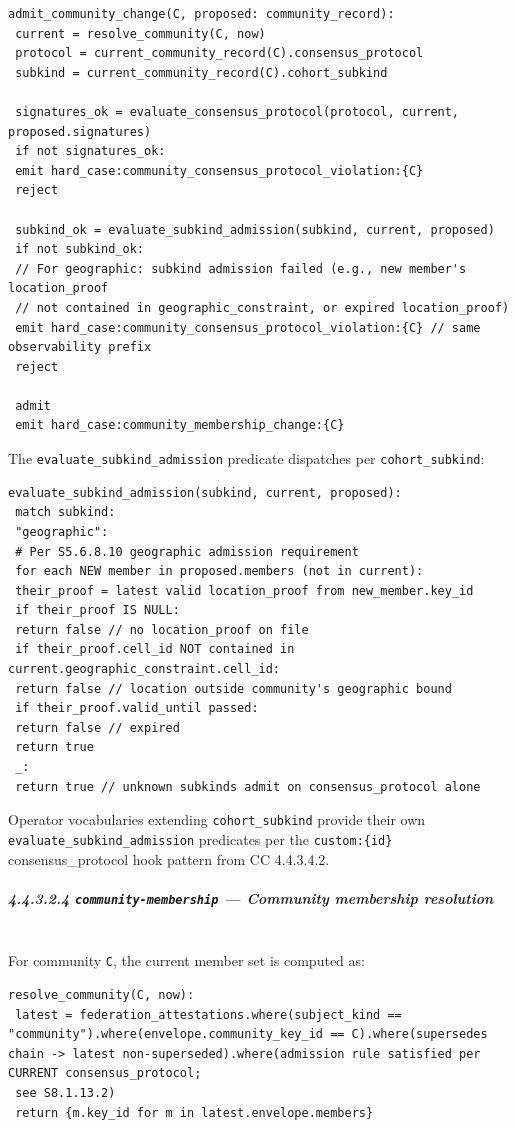 \documentclass[11pt]{article}
\begin{document}
\begin{lstlisting}
admit_community_change(C, proposed: community_record):
 current = resolve_community(C, now)
 protocol = current_community_record(C).consensus_protocol
 subkind = current_community_record(C).cohort_subkind

 signatures_ok = evaluate_consensus_protocol(protocol, current, proposed.signatures)
 if not signatures_ok:
 emit hard_case:community_consensus_protocol_violation:{C}
 reject

 subkind_ok = evaluate_subkind_admission(subkind, current, proposed)
 if not subkind_ok:
 // For geographic: subkind admission failed (e.g., new member's location_proof
 // not contained in geographic_constraint, or expired location_proof)
 emit hard_case:community_consensus_protocol_violation:{C} // same observability prefix
 reject

 admit
 emit hard_case:community_membership_change:{C}
\end{lstlisting}

The \texttt{evaluate\_subkind\_admission} predicate dispatches per \texttt{cohort\_subkind}:


\begin{lstlisting}
evaluate_subkind_admission(subkind, current, proposed):
 match subkind:
 "geographic":
 # Per S5.6.8.10 geographic admission requirement
 for each NEW member in proposed.members (not in current):
 their_proof = latest valid location_proof from new_member.key_id
 if their_proof IS NULL:
 return false // no location_proof on file
 if their_proof.cell_id NOT contained in current.geographic_constraint.cell_id:
 return false // location outside community's geographic bound
 if their_proof.valid_until passed:
 return false // expired
 return true
 _:
 return true // unknown subkinds admit on consensus_protocol alone
\end{lstlisting}

Operator vocabularies extending \texttt{cohort\_subkind} provide their own \texttt{evaluate\_subkind\_admission} predicates per the \texttt{custom:\{id\}} consensus\_protocol hook pattern from CC 4.4.3.4.2.


\subparagraph{4.4.3.2.4 \texttt{community-membership} — Community membership resolution}\mbox{}\\


For community \texttt{C}, the current member set is computed as:


\begin{lstlisting}
resolve_community(C, now):
 latest = federation_attestations.where(subject_kind == "community").where(envelope.community_key_id == C).where(supersedes chain -> latest non-superseded).where(admission rule satisfied per CURRENT consensus_protocol;
 see S8.1.13.2)
 return {m.key_id for m in latest.envelope.members}
\end{lstlisting}
\end{document}
